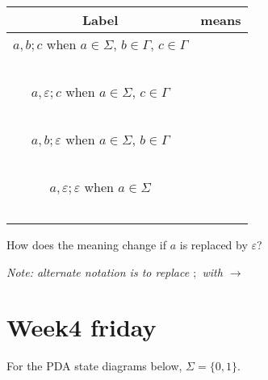 \documentclass[12pt, oneside]{article}
\begin{document}
\begin{center}
\begin{tabular}{|c|c|}
\hline
Label & means \\
\hline
$a, b ; c$ when $a \in \Sigma$, $b\in \Gamma$, $c \in \Gamma$ 
& \hspace{3in} \\
& \\
& \\
& \\
& \\
&\\
\hline
$a, \varepsilon ; c$ when $a \in \Sigma$, $c \in \Gamma$ 
& \hspace{3in} \\
& \\
& \\
& \\
& \\
&\\
\hline
$a, b ; \varepsilon$ when $a \in \Sigma$, $b\in \Gamma$
& \hspace{3in} \\
& \\
& \\
& \\
& \\
&\\
\hline
$a, \varepsilon ; \varepsilon$ when $a \in \Sigma$
& \hspace{3in} \\
& \\
& \\
& \\
& \\
&\\
\hline
\end{tabular}
\end{center}


How does the meaning change if $a$ is replaced by $\varepsilon$?

{\it Note: alternate notation is to replace $;$ with $\to$}
 \vfill
\section*{Week4 friday}


    
For the PDA state diagrams below, $\Sigma = \{0,1\}$.
\end{document}
